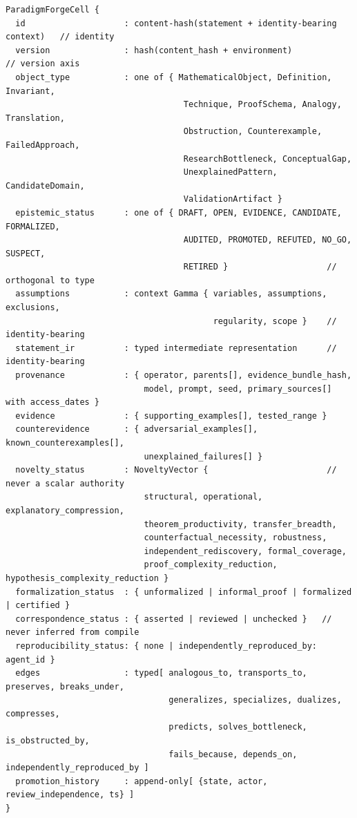 \documentclass[11pt]{article}
\theoremstyle{definition}
\theoremstyle{remark}
\begin{document}
{\footnotesize\begin{verbatim}
ParadigmForgeCell {
  id                    : content-hash(statement + identity-bearing context)   // identity
  version               : hash(content_hash + environment)                     // version axis
  object_type           : one of { MathematicalObject, Definition, Invariant,
                                    Technique, ProofSchema, Analogy, Translation,
                                    Obstruction, Counterexample, FailedApproach,
                                    ResearchBottleneck, ConceptualGap,
                                    UnexplainedPattern, CandidateDomain,
                                    ValidationArtifact }
  epistemic_status      : one of { DRAFT, OPEN, EVIDENCE, CANDIDATE, FORMALIZED,
                                    AUDITED, PROMOTED, REFUTED, NO_GO, SUSPECT,
                                    RETIRED }                    // orthogonal to type
  assumptions           : context Gamma { variables, assumptions, exclusions,
                                          regularity, scope }    // identity-bearing
  statement_ir          : typed intermediate representation      // identity-bearing
  provenance            : { operator, parents[], evidence_bundle_hash,
                            model, prompt, seed, primary_sources[] with access_dates }
  evidence              : { supporting_examples[], tested_range }
  counterevidence       : { adversarial_examples[], known_counterexamples[],
                            unexplained_failures[] }
  novelty_status        : NoveltyVector {                        // never a scalar authority
                            structural, operational, explanatory_compression,
                            theorem_productivity, transfer_breadth,
                            counterfactual_necessity, robustness,
                            independent_rediscovery, formal_coverage,
                            proof_complexity_reduction, hypothesis_complexity_reduction }
  formalization_status  : { unformalized | informal_proof | formalized | certified }
  correspondence_status : { asserted | reviewed | unchecked }   // never inferred from compile
  reproducibility_status: { none | independently_reproduced_by: agent_id }
  edges                 : typed[ analogous_to, transports_to, preserves, breaks_under,
                                 generalizes, specializes, dualizes, compresses,
                                 predicts, solves_bottleneck, is_obstructed_by,
                                 fails_because, depends_on, independently_reproduced_by ]
  promotion_history     : append-only[ {state, actor, review_independence, ts} ]
}
\end{verbatim}}
\end{document}

